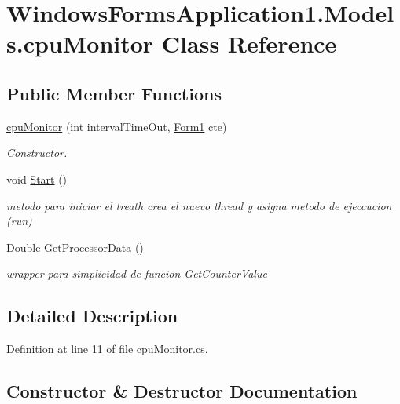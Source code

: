 \hypertarget{class_windows_forms_application1_1_1_models_1_1cpu_monitor}{}\section{Windows\+Forms\+Application1.\+Models.\+cpu\+Monitor Class Reference}
\label{class_windows_forms_application1_1_1_models_1_1cpu_monitor}
\subsection*{Public Member Functions}
\begin{DoxyCompactItemize}
\item 
\hyperlink{class_windows_forms_application1_1_1_models_1_1cpu_monitor_aa93e334b10d2ecf00c55e266846467e2}{cpu\+Monitor} (int interval\+Time\+Out, \hyperlink{class_windows_forms_application1_1_1_form1}{Form1} cte)
\begin{DoxyCompactList}\small\item\em Constructor. \end{DoxyCompactList}\item 
void \hyperlink{class_windows_forms_application1_1_1_models_1_1cpu_monitor_ab10f241a0b2ee431cb44daf3a0f8e972}{Start} ()
\begin{DoxyCompactList}\small\item\em metodo para iniciar el treath crea el nuevo thread y asigna metodo de ejeccucion (run) \end{DoxyCompactList}\item 
Double \hyperlink{class_windows_forms_application1_1_1_models_1_1cpu_monitor_ab9b7d5ae64eac03b98d128bb1c42e900}{Get\+Processor\+Data} ()
\begin{DoxyCompactList}\small\item\em wrapper para simplicidad de funcion Get\+Counter\+Value \end{DoxyCompactList}\end{DoxyCompactItemize}


\subsection{Detailed Description}


Definition at line 11 of file cpu\+Monitor.\+cs.



\subsection{Constructor \& Destructor Documentation}
\hypertarget{class_windows_forms_application1_1_1_models_1_1cpu_monitor_aa93e334b10d2ecf00c55e266846467e2}{}
